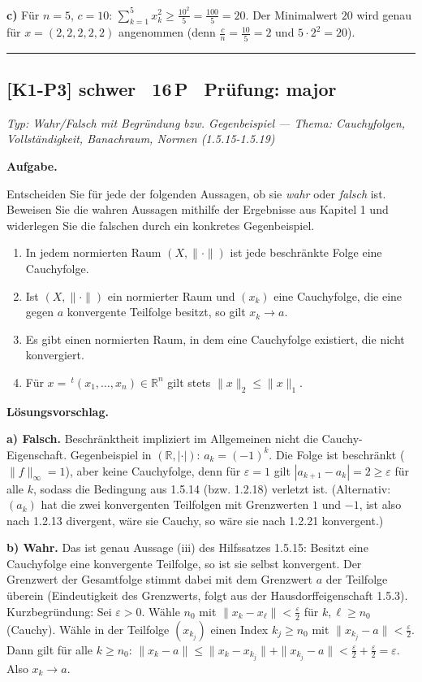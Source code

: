 \documentclass[a4paper,11pt]{article}
\begin{document}
\textbf{c)} Für $n=5$, $c=10$: $\displaystyle \sum_{k=1}^5 x_k^2 \ge \frac{10^2}{5}=\frac{100}{5}=20.$ Der Minimalwert $20$ wird genau für $x=(2,2,2,2,2)$ angenommen (denn $\tfrac{c}{n}=\tfrac{10}{5}=2$ und $5\cdot 2^2=20$).\par\bigskip\hrule\bigskip
\subsection*{[K1-P3] \normalfont schwer \textbullet\ 16\,P \textbullet\ Pr\"ufung: major}
\textit{Typ: Wahr/Falsch mit Begründung bzw. Gegenbeispiel  ---  Thema: Cauchyfolgen, Vollständigkeit, Banachraum, Normen (1.5.15-1.5.19)}\par\smallskip
\textbf{Aufgabe.}\par
Entscheiden Sie für jede der folgenden Aussagen, ob sie \emph{wahr} oder \emph{falsch} ist. Beweisen Sie die wahren Aussagen mithilfe der Ergebnisse aus Kapitel 1 und widerlegen Sie die falschen durch ein konkretes Gegenbeispiel.
\begin{enumerate}[label=\alph*)]
\item In jedem normierten Raum $(X,\|\cdot\|)$ ist jede beschränkte Folge eine Cauchyfolge.
\item Ist $(X,\|\cdot\|)$ ein normierter Raum und $(x_k)$ eine Cauchyfolge, die eine gegen $a$ konvergente Teilfolge besitzt, so gilt $x_k\to a$.
\item Es gibt einen normierten Raum, in dem eine Cauchyfolge existiert, die nicht konvergiert.
\item Für $x=\,^{t}(x_1,\dots,x_n)\in\mathbb{R}^n$ gilt stets $\|x\|_2 \le \|x\|_1$.
\end{enumerate}\par\smallskip
\textbf{L\"osungsvorschlag.}\par
\textbf{a) Falsch.} Beschränktheit impliziert im Allgemeinen nicht die Cauchy-Eigenschaft. Gegenbeispiel in $(\mathbb{R},|\cdot|)$: $a_k=(-1)^k$. Die Folge ist beschränkt ($\|f\|_\infty=1$), aber keine Cauchyfolge, denn für $\varepsilon=1$ gilt $|a_{k+1}-a_k|=2\ge\varepsilon$ für alle $k$, sodass die Bedingung aus 1.5.14 (bzw. 1.2.18) verletzt ist. (Alternativ: $(a_k)$ hat die zwei konvergenten Teilfolgen mit Grenzwerten $1$ und $-1$, ist also nach 1.2.13 divergent, wäre sie Cauchy, so wäre sie nach 1.2.21 konvergent.)

\textbf{b) Wahr.} Das ist genau Aussage (iii) des Hilfssatzes 1.5.15: Besitzt eine Cauchyfolge eine konvergente Teilfolge, so ist sie selbst konvergent. Der Grenzwert der Gesamtfolge stimmt dabei mit dem Grenzwert $a$ der Teilfolge überein (Eindeutigkeit des Grenzwerts, folgt aus der Hausdorffeigenschaft 1.5.3). Kurzbegründung: Sei $\varepsilon>0$. Wähle $n_0$ mit $\|x_k-x_\ell\|<\tfrac{\varepsilon}{2}$ für $k,\ell\ge n_0$ (Cauchy). Wähle in der Teilfolge $(x_{k_j})$ einen Index $k_j\ge n_0$ mit $\|x_{k_j}-a\|<\tfrac{\varepsilon}{2}$. Dann gilt für alle $k\ge n_0$: $\|x_k-a\|\le\|x_k-x_{k_j}\|+\|x_{k_j}-a\|<\tfrac{\varepsilon}{2}+\tfrac{\varepsilon}{2}=\varepsilon$. Also $x_k\to a$.
\end{document}
